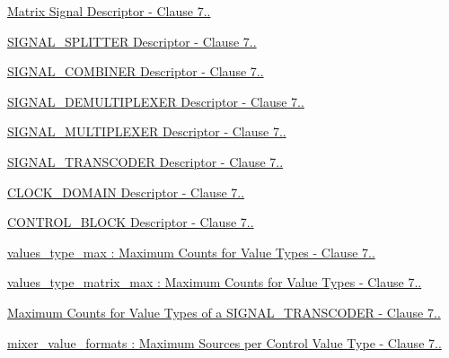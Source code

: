 \begin{DoxyCompactItemize}
\item 
\hyperlink{group__descriptor__matrix__signal}{Matrix Signal Descriptor -\/ Clause 7..}
\item 
\hyperlink{group__descriptor__signal__splitter}{S\+I\+G\+N\+A\+L\+\_\+\+S\+P\+L\+I\+T\+T\+E\+R Descriptor -\/ Clause 7..}
\item 
\hyperlink{group__descriptor__signal__combiner}{S\+I\+G\+N\+A\+L\+\_\+\+C\+O\+M\+B\+I\+N\+E\+R Descriptor -\/ Clause 7..}
\item 
\hyperlink{group__descriptor__signal__demultiplexer}{S\+I\+G\+N\+A\+L\+\_\+\+D\+E\+M\+U\+L\+T\+I\+P\+L\+E\+X\+E\+R Descriptor -\/ Clause 7..}
\item 
\hyperlink{group__descriptor__signal__multiplexer}{S\+I\+G\+N\+A\+L\+\_\+\+M\+U\+L\+T\+I\+P\+L\+E\+X\+E\+R Descriptor -\/ Clause 7..}
\item 
\hyperlink{group__descriptor__transcoder}{S\+I\+G\+N\+A\+L\+\_\+\+T\+R\+A\+N\+S\+C\+O\+D\+E\+R Descriptor -\/ Clause 7..}
\item 
\hyperlink{group__descriptor__clock__domain}{C\+L\+O\+C\+K\+\_\+\+D\+O\+M\+A\+I\+N Descriptor -\/ Clause 7..}
\item 
\hyperlink{group__descriptor__control__block}{C\+O\+N\+T\+R\+O\+L\+\_\+\+B\+L\+O\+C\+K Descriptor -\/ Clause 7..}
\item 
\hyperlink{group__values__type__max}{values\+\_\+type\+\_\+max \+: Maximum Counts for Value Types -\/ Clause 7..}
\item 
\hyperlink{group__values__type__matrix__max}{values\+\_\+type\+\_\+matrix\+\_\+max \+: Maximum Counts for Value Types -\/ Clause 7..}
\item 
\hyperlink{group__transcoder__values__type__max}{Maximum Counts for Value Types of a S\+I\+G\+N\+A\+L\+\_\+\+T\+R\+A\+N\+S\+C\+O\+D\+E\+R -\/ Clause 7..}
\item 
\hyperlink{group__mixer__value__formats}{mixer\+\_\+value\+\_\+formats \+: Maximum Sources per Control Value Type -\/ Clause 7..}
\end{DoxyCompactItemize}
